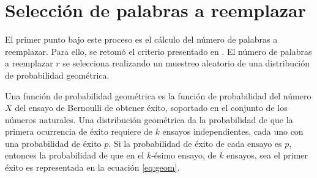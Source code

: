  
%



\section{Selección de palabras a reemplazar}

El primer punto bajo este proceso es el cálculo del número de palabras a reemplazar. Para ello, se retomó el criterio presentado en \citep{zhang2015character}. El número de palabras a reemplazar $r$ se selecciona realizando un muestreo aleatorio de una distribución de probabilidad geométrica. 

Una función de probabilidad geométrica es la función de probabilidad del número $X$ del ensayo de Bernoulli de obtener éxito, soportado en el conjunto de los números naturales. Una distribución geométrica da la probabilidad de que la primera ocurrencia de éxito requiere de $k$ ensayos independientes, cada uno con una probabilidad de éxito $p$. Si la probabilidad de éxito de cada ensayo es $p$, entonces la probabilidad de que en el $k$-ésimo ensayo, de $k$ ensayos, sea el primer éxito es representada en la ecuación \ref{eq:geom}.

